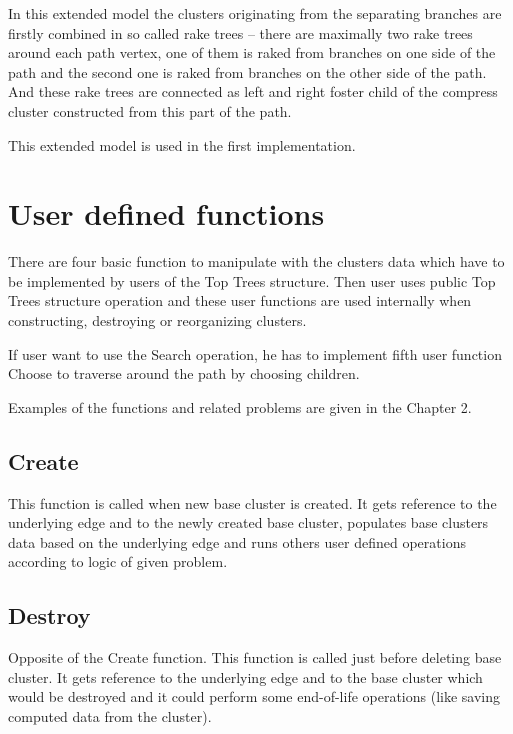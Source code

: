 In this extended model the clusters originating from the separating branches are
firstly combined in so called {\I rake trees} -- there are maximally two rake
trees around each path vertex, one of them is raked from branches on one side of
the path and the second one is raked from branches on the other side of the
path. And these rake trees are connected as left and right foster child of the
compress cluster constructed from this part of the path.


This extended model is used in the first implementation.




\section{User defined functions}

There are four basic function to manipulate with the clusters data which have to
be implemented by users of the Top Trees structure. Then user uses public Top
Trees structure operation and these user functions are used internally when
constructing, destroying or reorganizing clusters.

If user want to use the {\I Search} operation, he has to implement fifth user
function {\I Choose} to traverse around the path by choosing children.

Examples of the functions and related problems are given in the Chapter 2.

\subsection{Create}

This function is called when new base cluster is created. It gets reference to
the underlying edge and to the newly created base cluster, populates base
clusters data based on the underlying edge and runs others user defined
operations according to logic of given problem.

\subsection{Destroy}

Opposite of the Create function. This function is called just before deleting
base cluster. It gets reference to the underlying edge and to the base cluster
which would be destroyed and it could perform some end-of-life operations (like
saving computed data from the cluster).

